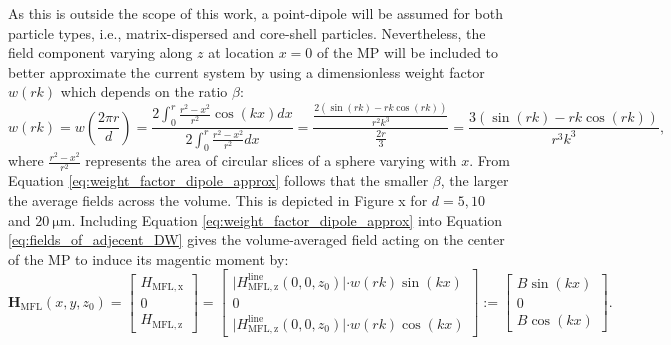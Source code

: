 As this is outside the scope of this work, a point-dipole will be assumed for both particle types, i.e., matrix-dispersed and core-shell particles.
Nevertheless, the field component varying along $z$ at location $x = 0$ of the \ac{MP} will be included to better approximate the current system by using a dimensionless weight factor $w(rk)$ which depends on the ratio $\beta$\cite{Ehresmann2026}:
\begin{equation}\label{eq:weight_factor_dipole_approx}
    w(rk) = w\left(\frac{2\pi r}{d}\right) = \frac{2 \int_0^r \frac{r^2-x^2}{r^2}\cos(kx)dx}{2 \int_0^r \frac{r^2-x^2}{r^2}dx} = \frac{\frac{2(\sin(rk)-rk\cos(rk))}{r^2k^3}}{\frac{2r}{3}}=\frac{3(\sin(rk)-rk\cos(rk))}{r^3k^3}, 
\end{equation}
where $\frac{r^2-x^2}{r^2}$ represents the area of circular slices of a sphere varying with $x$.  
From Equation \ref{eq:weight_factor_dipole_approx} follows that the smaller $\beta$, the larger the average fields across the volume.
This is depicted in Figure x for $d = 5,10$ and $\SI{20}{\micro\meter}$.
Including Equation \ref{eq:weight_factor_dipole_approx} into Equation \ref{eq:fields_of_adjecent_DW} gives the volume-averaged field acting on the center of the \ac{MP} to induce its magentic moment by\cite{Ehresmann2026}:
\begin{equation}\label{eq:H_eff_Arno}
    \mathbf{H}_\mathrm{MFL}(x,y,z_0) = \begin{bmatrix}
                                        H_\mathrm{MFL, x} \\
                                        0 \\
                                        H_\mathrm{MFL, z}
                                    \end{bmatrix} 
                            =
                                    \begin{bmatrix}
                                        \rvert H_\mathrm{MFL,z}^\mathrm{line}(0,0,z_0)\lvert\cdot w(rk)\sin(kx)\\
                                        0 \\
                                        \rvert H_\mathrm{MFL,z}^\mathrm{line}(0,0,z_0)\lvert\cdot w(rk)\cos(kx)
                                    \end{bmatrix}
                                    :=
                                    \begin{bmatrix}
                                        B\sin(kx) \\
                                        0 \\
                                        B\cos(kx)
                                    \end{bmatrix}.
\end{equation}

